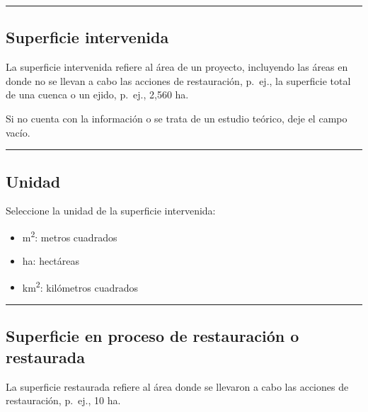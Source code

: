 \documentclass[
]{book}
\providecommand{\tightlist}{%
  \setlength{\itemsep}{0pt}\setlength{\parskip}{0pt}}
\begin{document}
\begin{center}\rule{0.5\linewidth}{0.5pt}\end{center}

\hypertarget{superficie-intervenida}{%
\subsection*{Superficie intervenida}\label{superficie-intervenida}}

La superficie intervenida refiere al área de un proyecto, incluyendo las áreas en donde no se llevan a cabo las acciones de restauración, p.~ej., la superficie total de una cuenca o un ejido, p.~ej., 2,560 ha.

Si no cuenta con la información o se trata de un estudio teórico, deje el campo vacío.

\begin{center}\rule{0.5\linewidth}{0.5pt}\end{center}

\hypertarget{unidad}{%
\subsection*{Unidad}\label{unidad}}

Seleccione la unidad de la superficie intervenida:

\begin{itemize}
\tightlist
\item
  m\textsuperscript{2}: metros cuadrados
\item
  ha: hectáreas
\item
  km\textsuperscript{2}: kilómetros cuadrados
\end{itemize}

\begin{center}\rule{0.5\linewidth}{0.5pt}\end{center}

\hypertarget{superficie-en-proceso-de-restauraciuxf3n-o-restaurada}{%
\subsection*{Superficie en proceso de restauración o restaurada}\label{superficie-en-proceso-de-restauraciuxf3n-o-restaurada}}

La superficie restaurada refiere al área donde se llevaron a cabo las acciones de restauración, p.~ej., 10 ha.
\end{document}
